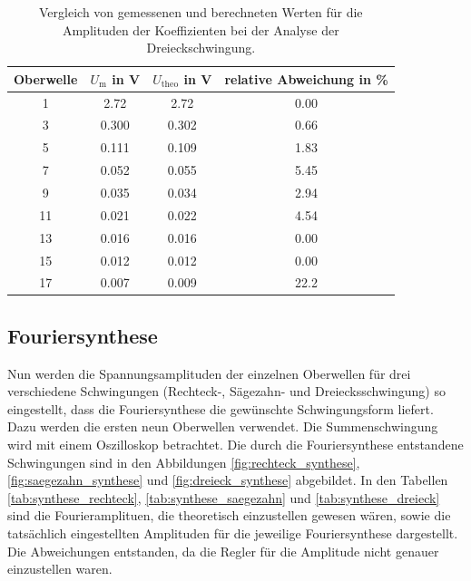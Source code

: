 \begin{table}
  \centering
  \begin{tabular}{c c c c}
    \toprule
    Oberwelle & $U_\text{m}$ in \si{\volt} & $U_\text{theo}$ in \si{\volt} &
    relative Abweichung in \% \\
    \midrule
    1  & 2.72  & 2.72  & 0.00 \\
    3  & 0.300 & 0.302 & 0.66 \\
    5  & 0.111 & 0.109 & 1.83 \\
    7  & 0.052 & 0.055 & 5.45 \\
    9  & 0.035 & 0.034 & 2.94 \\
    11 & 0.021 & 0.022 & 4.54 \\
    13 & 0.016 & 0.016 & 0.00 \\
    15 & 0.012 & 0.012 & 0.00 \\
    17 & 0.007 & 0.009 & 22.2 \\
    \bottomrule
  \end{tabular}
  \caption{Vergleich von gemessenen und berechneten Werten für die Amplituden
    der Koeffizienten bei der Analyse der Dreieckschwingung.}
  \label{tab:analyse_dreieck}
\end{table}


\subsection{Fouriersynthese}
Nun werden die Spannungsamplituden der einzelnen Oberwellen für drei verschiedene
Schwingungen (Rechteck-, Sägezahn- und Dreiecksschwingung) so eingestellt, dass
die Fouriersynthese die gewünschte Schwingungsform liefert. Dazu werden die ersten
neun Oberwellen verwendet.
Die Summenschwingung wird mit einem Oszilloskop betrachtet. Die durch die
Fouriersynthese entstandene Schwingungen sind in den Abbildungen
\ref{fig:rechteck_synthese}, \ref{fig:saegezahn_synthese} und \ref{fig:dreieck_synthese}
abgebildet. In den Tabellen \ref{tab:synthese_rechteck}, \ref{tab:synthese_saegezahn}
und \ref{tab:synthese_dreieck} sind die Fourieramplituen, die theoretisch
einzustellen gewesen wären, sowie die tatsächlich eingestellten Amplituden für die
jeweilige Fouriersynthese dargestellt. Die Abweichungen entstanden, da die Regler
für die Amplitude nicht genauer einzustellen waren.

\newpage

